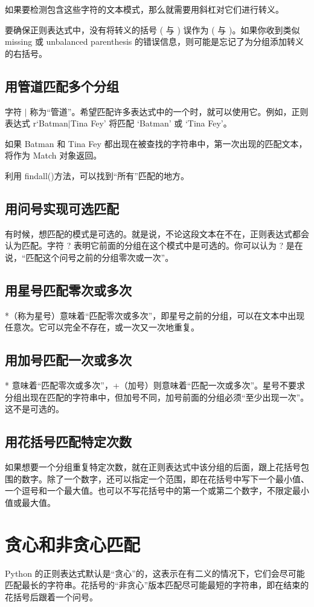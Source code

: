 如果要检测包含这些字符的文本模式，那么就需要用斜杠对它们进行转义。

要确保正则表达式中，没有将转义的括号 ( 与 ) 误作为 ( 与 )。如果你收到类似 missing 或 unbalanced parenthesis 的错误信息，则可能是忘记了为分组添加转义的右括号。
\subsection{用管道匹配多个分组}
字符 $|$ 称为“管道”。希望匹配许多表达式中的一个时，就可以使用它。例如，正则表达式 r`Batman$|$Tina Fey' 将匹配 `Batman' 或 `Tina Fey'。

如果 Batman 和 Tina Fey 都出现在被查找的字符串中，第一次出现的匹配文本，将作为 Match 对象返回。

\begin{tcolorbox}
    利用 findall()方法，可以找到“所有”匹配的地方。
\end{tcolorbox}
\subsection{用问号实现可选匹配}
有时候，想匹配的模式是可选的。就是说，不论这段文本在不在，正则表达式都会认为匹配。字符 ? 表明它前面的分组在这个模式中是可选的。你可以认为 ? 是在说，“匹配这个问号之前的分组零次或一次”。
\subsection{用星号匹配零次或多次}
*（称为星号）意味着“匹配零次或多次”，即星号之前的分组，可以在文本中出现任意次。它可以完全不存在，或一次又一次地重复。
\subsection{用加号匹配一次或多次}
* 意味着“匹配零次或多次”，+（加号）则意味着“匹配一次或多次”。星号不要求分组出现在匹配的字符串中，但加号不同，加号前面的分组必须“至少出现一次”。这不是可选的。
\subsection{用花括号匹配特定次数}
如果想要一个分组重复特定次数，就在正则表达式中该分组的后面，跟上花括号包围的数字。除了一个数字，还可以指定一个范围，即在花括号中写下一个最小值、一个逗号和一个最大值。也可以不写花括号中的第一个或第二个数字，不限定最小值或最大值。
\section{贪心和非贪心匹配}
Python 的正则表达式默认是“贪心”的，这表示在有二义的情况下，它们会尽可能匹配最长的字符串。花括号的“非贪心”版本匹配尽可能最短的字符串，即在结束的花括号后跟着一个问号。

